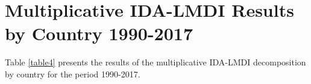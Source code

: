\documentclass[energies,article,accept,moreauthors,12pt,a4paper]{mdpi} %
\begin{document}
%
%












\section{Multiplicative IDA-LMDI Results by Country 1990-2017}\label{app4}

Table \ref{table4} presents the results of the multiplicative IDA-LMDI decomposition by country for the period 1990-2017.
\end{document}
